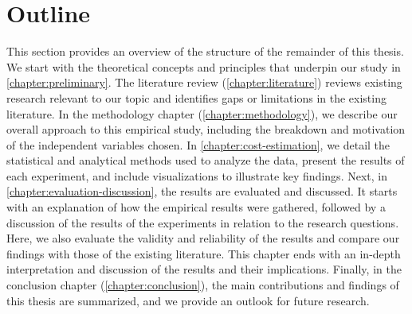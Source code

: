 \section{Outline}
This section provides an overview of the structure of the remainder of this thesis. We start with the theoretical concepts and principles that underpin our study in \autoref{chapter:preliminary}. The literature review (\autoref{chapter:literature}) reviews existing research relevant to our topic and identifies gaps or limitations in the existing literature. In the methodology chapter (\autoref{chapter:methodology}), we describe our overall approach to this empirical study, including the breakdown and motivation of the independent variables chosen.  In \autoref{chapter:cost-estimation}, we detail the statistical and analytical methods used to analyze the data, present the results of each experiment, and include visualizations to illustrate key findings. Next, in \autoref{chapter:evaluation-discussion}, the results are evaluated and discussed. It starts with an explanation of how the empirical results were gathered, followed by a discussion of the results of the experiments in relation to the research questions. Here, we also evaluate the validity and reliability of the results and compare our findings with those of the existing literature. This chapter ends with an in-depth interpretation and discussion of the results and their implications.  Finally, in the conclusion chapter (\autoref{chapter:conclusion}), the main contributions and findings of this thesis are summarized, and we provide an outlook for future research.

